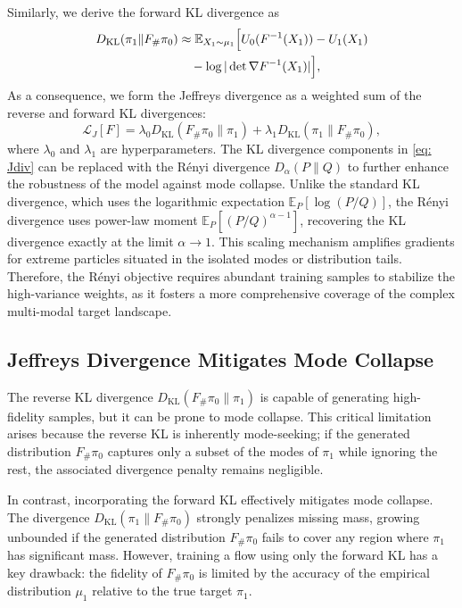 \documentclass[%
 reprint,
 amsmath,amssymb,
 aps,
 pre,
]{revtex4-2}
\DeclareMathOperator{\KL}{KL}
\begin{document}
Similarly, we derive the forward KL divergence as
\begin{align}
	D_{\KL}(\pi_1\|F_\#\pi_0) 
	&\approx \mathbb E_{X_1 \sim \mu_1} \Big[ U_0(F^{-1}(X_1)) - U_1(X_1) \notag \\
	&\quad - \log|\det\nabla F^{-1}(X_1)| \Big],
	\label{eq: fKL}
\end{align}
As a consequence, we form the Jeffreys divergence as a weighted sum of the reverse and forward KL divergences:
\begin{equation}
	\mathcal L_J[F] = \lambda_0 D_{\KL}(F_\#\pi_0\|\pi_1) + \lambda_1 D_{\KL}(\pi_1\|F_\#\pi_0),
	\label{eq: Jdiv}
\end{equation}
where $\lambda_0$ and $\lambda_1$ are hyperparameters. 
The KL divergence components in \eqref{eq: Jdiv} can be replaced with the Rényi divergence $D_\alpha(P\|Q)$ to further enhance the robustness of the model against mode collapse. Unlike the standard KL divergence, which uses the logarithmic expectation $\mathbb E_P[\log(P/Q)]$, the Rényi divergence uses power-law moment $\mathbb E_P[(P/Q)^{\alpha-1}]$, recovering the KL divergence exactly at the limit $\alpha \to 1$. This scaling mechanism amplifies gradients for extreme particles situated in the isolated modes or distribution tails. Therefore, the Rényi objective requires abundant training samples to stabilize the high-variance weights, as it fosters a more comprehensive coverage of the complex multi-modal target landscape.

\subsection{Jeffreys Divergence Mitigates Mode Collapse}

The reverse KL divergence $D_{\KL}(F_\#\pi_0\|\pi_1)$ is capable of generating high-fidelity samples, but it can be prone to mode collapse. This critical limitation arises because the reverse KL is inherently mode-seeking; if the generated distribution $F_\#\pi_0$ captures only a subset of the modes of $\pi_1$ while ignoring the rest, the associated divergence penalty remains negligible.

In contrast, incorporating the forward KL effectively mitigates mode collapse. The divergence $D_{\KL}(\pi_1\|F_\#\pi_0)$ strongly penalizes missing mass, growing unbounded if the generated distribution $F_\#\pi_0$ fails to cover any region where  $\pi_1$ has significant mass. However, training a flow using only the forward KL has a key drawback: the fidelity of $F_\#\pi_0$ is limited by the accuracy of the empirical distribution $\mu_1$ relative to the true target $\pi_1$.
\end{document}
